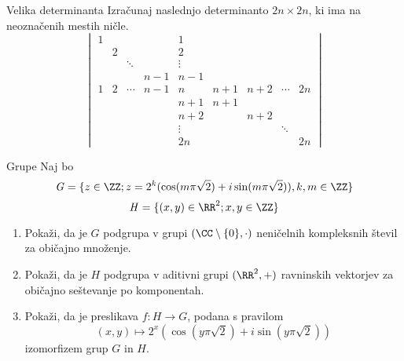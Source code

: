 \begin{frame}{Velika determinanta}
	Izračunaj naslednjo determinanto $2n \times 2n$, ki ima na neoznačenih mestih ničle.
	\[\begin{vmatrix}
		1 &   &                       &     & 1                     &     &     &                       &    \\
  		& 2 &                       &     & 2                     &     &     &                       &    \\
  		&   & \ddots &     & \vdots &     &     &                       &    \\
  		&   &                       & n-1 & n-1                   &     &     &                       &    \\
		1 & 2 & \cdots & n-1 & n                     & n+1 & n+2 & \cdots & 2n \\
  		&   &                       &     & n+1                   & n+1 &     &                       &    \\
  		&   &                       &     & n+2                   &     & n+2 &                       &    \\
  		&   &                       &     & \vdots &     &     & \ddots &    \\
  		&   &                       &     & 2n                    &     &     &                       & 2n
	\end{vmatrix}
	\]
\end{frame}

\begin{frame}{Grupe}
	Naj bo
	$$\mathit{G} = \{z \in \ZZ ; \space z = 2^k (\cos(m\pi \sqrt{2}) + i\sin(m\pi \sqrt{2})), k,m \in \ZZ \} $$
	$$ \mathit{H} = \{ (x,y) \in \RR^2; \space x,y \in \ZZ \} $$
	\begin{enumerate}
		\item
			Pokaži, da je $G$ podgrupa v grupi $(\CC \setminus \{0\},\cdot)$
			neničelnih kompleksnih števil za običajno množenje.
		\item
			Pokaži, da je $H$ podgrupa v aditivni grupi $(\RR^2,+)$
			ravninskih vektorjev za običajno seštevanje po komponentah.
		\item
			Pokaži, da je preslikava $f:H\to G$, podana s pravilom
			$$ (x,y) \mapsto 2^x (\cos(y\pi\sqrt{2}) + i \sin(y\pi\sqrt{2})) $$
			izomorfizem grup $G$ in $H$.
	\end{enumerate}
\end{frame}
